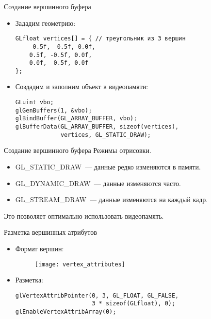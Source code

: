 \documentclass{beamer}
\begin{document}
\begin{frame}[fragile]{Создание вершинного буфера}
    \begin{itemize}
        \item Зададим геометрию:
            {\small \begin{lstlisting}
GLfloat vertices[] = { // треугольник из 3 вершин
    -0.5f, -0.5f, 0.0f,
    0.5f, -0.5f, 0.0f,
    0.0f,  0.5f, 0.0f
};
            \end{lstlisting}}
        \item Создадим и заполним объект в видеопамяти:
            {\small \begin{lstlisting}
GLuint vbo;
glGenBuffers(1, &vbo);
glBindBuffer(GL_ARRAY_BUFFER, vbo);
glBufferData(GL_ARRAY_BUFFER, sizeof(vertices),
             vertices, GL_STATIC_DRAW);
            \end{lstlisting}}
    \end{itemize}
\end{frame}

\begin{frame}[fragile]{Создание вершинного буфера}
    Режимы отрисовки.
    \begin{itemize}
        \item GL\_STATIC\_DRAW~--- данные редко изменяются в памяти.
        \item GL\_DYNAMIC\_DRAW~--- данные изменяются часто.
        \item GL\_STREAM\_DRAW~--- данные изменяются на каждый кадр.
    \end{itemize}
    Это позволяет оптимально использовать видеопамять.
\end{frame}

\begin{frame}[fragile]{Разметка вершинных атрибутов}
    \begin{itemize}
        \item Формат вершин:
            \begin{figure}[htp]
                \centering
                \texttt{[image: vertex\_attributes]}
            \end{figure}
        \item Разметка:
            {\small \begin{lstlisting}
glVertexAttribPointer(0, 3, GL_FLOAT, GL_FALSE,
                      3 * sizeof(GLfloat), 0);
glEnableVertexAttribArray(0);
            \end{lstlisting}}
    \end{itemize}
\end{frame}
\end{document}
